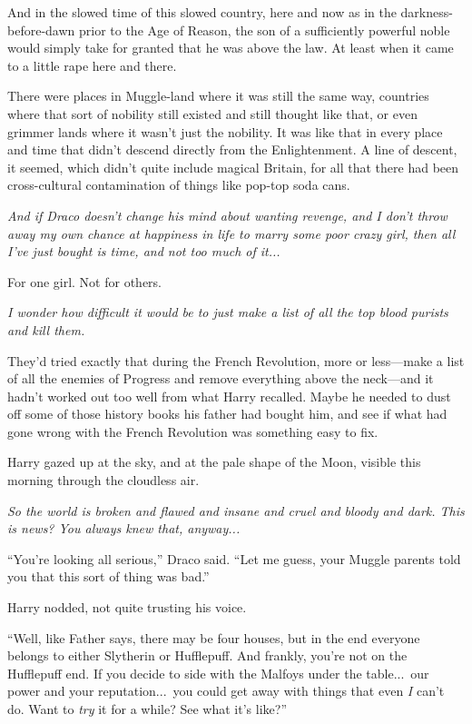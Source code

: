 And in the slowed time of this slowed country, here and now as in the darkness-before-dawn prior to the Age of Reason, the son of a sufficiently powerful noble would simply take for granted that he was above the law. At least when it came to a little rape here and there.

There were places in Muggle-land where it was still the same way, countries where that sort of nobility still existed and still thought like that, or even grimmer lands where it wasn’t just the nobility. It was like that in every place and time that didn’t descend directly from the Enlightenment. A line of descent, it seemed, which didn’t quite include magical Britain, for all that there had been cross-cultural contamination of things like pop-top soda cans.

\emph{And if Draco doesn’t change his mind about wanting revenge, and I don’t throw away my own chance at happiness in life to marry some poor crazy girl, then all I’ve just bought is time, and not too much of it...}

For one girl. Not for others.

\emph{I wonder how difficult it would be to just make a list of all the top blood purists and kill them.}

They’d tried exactly that during the French Revolution, more or less—make a list of all the enemies of Progress and remove everything above the neck—and it hadn’t worked out too well from what Harry recalled. Maybe he needed to dust off some of those history books his father had bought him, and see if what had gone wrong with the French Revolution was something easy to fix.

Harry gazed up at the sky, and at the pale shape of the Moon, visible this morning through the cloudless air.

\emph{So the world is broken and flawed and insane and cruel and bloody and dark. This is news? You always knew that, anyway...}

“You’re looking all serious,” Draco said. “Let me guess, your Muggle parents told you that this sort of thing was bad.”

Harry nodded, not quite trusting his voice.

“Well, like Father says, there may be four houses, but in the end everyone belongs to either Slytherin or Hufflepuff. And frankly, you’re not on the Hufflepuff end. If you decide to side with the Malfoys under the table...\ our power and your reputation...\ you could get away with things that even \emph{I} can’t do. Want to \emph{try} it for a while? See what it’s like?”

